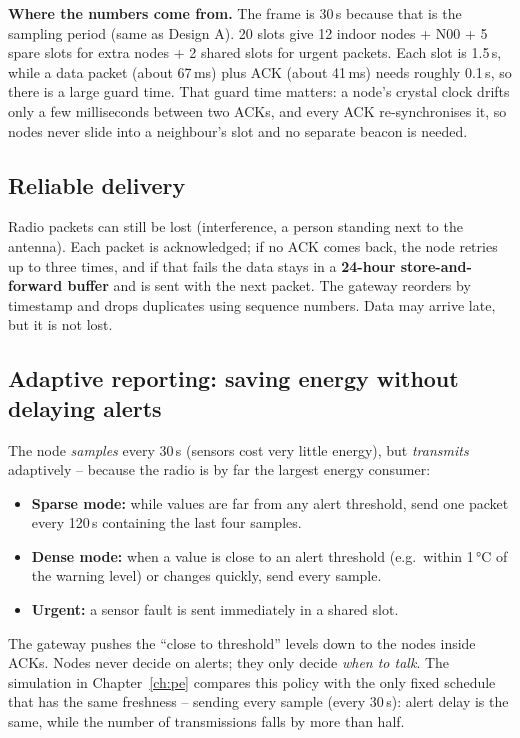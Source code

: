 \documentclass[11pt,a4paper]{report}
\newcommand{\why}[1]{\par\noindent\colorbox{gray!10}{\parbox{\dimexpr\linewidth-2\fboxsep}{\small\textbf{Where the numbers come from.} #1}}\par}
\begin{document}
\why{The frame is 30\,s because that is the sampling period (same as Design A). 20 slots give 12 indoor nodes + N00 + 5 spare slots for extra nodes + 2 shared slots for urgent packets. Each slot is 1.5\,s, while a data packet (about 67\,ms) plus ACK (about 41\,ms) needs roughly 0.1\,s, so there is a large guard time. That guard time matters: a node's crystal clock drifts only a few milliseconds between two ACKs, and every ACK re-synchronises it, so nodes never slide into a neighbour's slot and no separate beacon is needed.}

\subsection{Reliable delivery}
Radio packets can still be lost (interference, a person standing next to the antenna). Each packet is acknowledged; if no ACK comes back, the node retries up to three times, and if that fails the data stays in a \textbf{24-hour store-and-forward buffer} and is sent with the next packet. The gateway reorders by timestamp and drops duplicates using sequence numbers. Data may arrive late, but it is not lost.

\subsection{Adaptive reporting: saving energy without delaying alerts}\label{sec:adaptive}
The node \emph{samples} every 30\,s (sensors cost very little energy), but \emph{transmits} adaptively -- because the radio is by far the largest energy consumer:
\begin{itemize}[noitemsep]
  \item \textbf{Sparse mode:} while values are far from any alert threshold, send one packet every 120\,s containing the last four samples.
  \item \textbf{Dense mode:} when a value is close to an alert threshold (e.g.\ within 1\,°C of the warning level) or changes quickly, send every sample.
  \item \textbf{Urgent:} a sensor fault is sent immediately in a shared slot.
\end{itemize}
The gateway pushes the ``close to threshold'' levels down to the nodes inside ACKs. Nodes never decide on alerts; they only decide \emph{when to talk}. The simulation in Chapter~\ref{ch:pe} compares this policy with the only fixed schedule that has the same freshness -- sending every sample (every 30\,s): alert delay is the same, while the number of transmissions falls by more than half.
\end{document}

